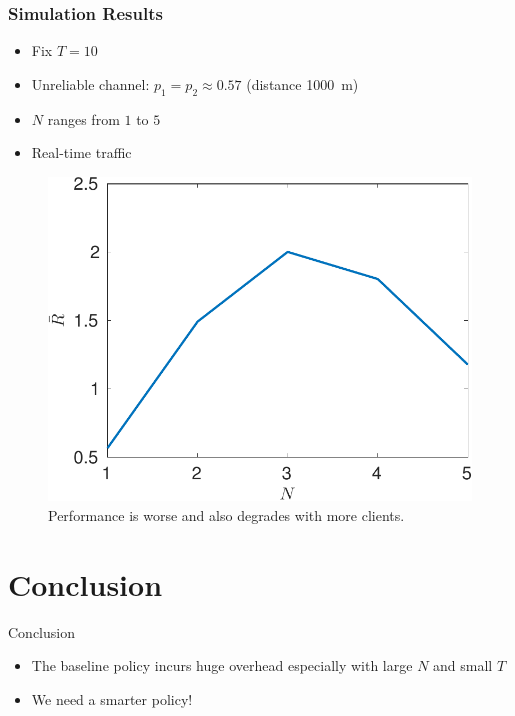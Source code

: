 \documentclass{beamer}
\begin{document}
\begin{frame}
\frametitle{Simulation Results}
\begin{itemize}
  \item Fix $T=10$
\item Unreliable channel: $p_1 = p_2 \approx 0.57$ (distance \SI{1000}{m})
\item $N$ ranges from $1$ to $5$
\item Real-time traffic
\end{itemize}
\begin{figure}[htbp]
  \centering
  \includegraphics[height=.5\textheight]{realtime_throughput_N.pdf}
  \caption{Performance is worse and also degrades with more clients.}
\end{figure}
\end{frame}

\section*{Conclusion}
\begin{frame}{Conclusion}
  \begin{itemize}
    \item The baseline policy incurs huge overhead especially with large $N$ and small $T$
    \item We need a smarter policy!
  \end{itemize}
\end{frame}
\end{document}
